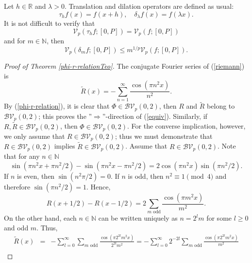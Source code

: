 \documentclass{amsart}
\numberwithin{equation}{section}
\begin{document}
Let $h\in\mathbb{R}$ and $\lambda>0$. Translation and dilation operators are defined as usual:
\begin{equation}
    \nonumber
    \tau_hf(x)=f(x+h),\quad \delta_\lambda f(x)=f(\lambda x).
\end{equation}
It is not difficult to verify that
\begin{equation}
    \label{invar1}
    \mathcal{V}_p(\tau_hf;[0,P])=\mathcal{V}_p(f;[0,P])
\end{equation}
and for $m\in\mathbb{N}$, then
\begin{equation}
    \label{invar2}
    \mathcal{V}_p(\delta_m f;[0,P])\le m^{1/p}\mathcal{V}_p(f;[0,P]).
\end{equation}

\begin{proof}[Proof of Theorem \ref{phi-r-relationTeo}]
    The conjugate Fourier series of (\ref{riemann}) is
    \begin{equation}
        \label{conjugate}
        \widetilde{R}(x)=-\sum_{n=1}^\infty\frac{\cos(\pi n^2 x)}{n^2}.
    \end{equation}
    By (\ref{phi-r-relation}), it is clear that $\Phi\in\mathcal{BV}_p(0,2)$, then $R$ and $\widetilde{R}$ belong to $\mathcal{BV}_p(0,2)$; this proves the ''$\Rightarrow$''-direction of (\ref{equiv}). Similarly, if $R,\widetilde{R}\in\mathcal{BV}_p(0,2)$, then $\Phi\in\mathcal{BV}_p(0,2)$. For the converse implication, however, we only assume that $R\in\mathcal{BV}_p(0,2)$; thus we must demonstrate that $R\in\mathcal{BV}_p(0,2)$ implies $\widetilde{R}\in\mathcal{BV}_p(0,2)$. Assume that $R\in\mathcal{BV}_p(0,2)$.
    Note that for any $n\in\mathbb{N}$ 
    \begin{equation}
        \nonumber
        \sin(\pi n^2x+\pi n^2/2)-\sin(\pi n^2x-\pi n^2/2)=2\cos(\pi n^2x)\sin(\pi n^2/2).
    \end{equation}
    If $n$ is even, then $\sin(n^2\pi/2)=0$. If $n$ is odd, then  $n^2\equiv 1\pmod{4}$ and therefore $\sin(\pi n^2/2)=1$. Hence,
    \begin{equation}
        \label{identityPhi}
        R(x+1/2)-R(x-1/2)=2\sum_{m\text{ odd}}\frac{\cos(\pi m^2x)}{m^2}.
    \end{equation}
    On the other hand, each $n\in\mathbb{N}$ can be written uniquely as $n=2^lm$ for some $l\ge0$ and odd $m$. Thus,
    \begin{eqnarray}
        \nonumber
        \widetilde{R}(x)&=&-\sum_{l=0}^\infty\sum_{m\text{ odd}}\frac{\cos(\pi 2^{2l}m^2x)}{2^{2l}m^2}=-\sum_{l=0}^\infty 2^{-2l}\sum_{m\text{ odd}}\frac{\cos(\pi 2^{2l}m^2x)}{m^2}\\

\end{eqnarray}
\end{proof}
\end{document}
